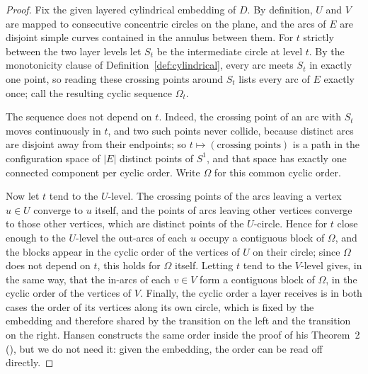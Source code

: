 \documentclass[11pt]{article}
\theoremstyle{definition}
\theoremstyle{remark}
\begin{document}
\begin{proof}
Fix the given layered cylindrical embedding of $D$. By definition, $U$ and $V$ are mapped to consecutive concentric circles on the plane, and the arcs of $E$ are disjoint simple curves contained in the annulus between them. For $t$ strictly between the two layer levels let $S_t$ be the intermediate circle at level $t$. By the monotonicity clause of Definition~\ref{def:cylindrical}, every arc meets $S_t$ in exactly one point, so reading these crossing points around $S_t$ lists every arc of $E$ exactly once; call the resulting cyclic sequence $\Omega_t$.

The sequence does not depend on $t$. Indeed, the crossing point of an arc with $S_t$ moves continuously in $t$, and two such points never collide, because distinct arcs are disjoint away from their endpoints; so $t\mapsto(\text{crossing points})$ is a path in the configuration space of $|E|$ distinct points of $S^1$, and that space has exactly one connected component per cyclic order. Write $\Omega$ for this common cyclic order.

Now let $t$ tend to the $U$-level. The crossing points of the arcs leaving a vertex $u\in U$ converge to $u$ itself, and the points of arcs leaving other vertices converge to those other vertices, which are distinct points of the $U$-circle. Hence for $t$ close enough to the $U$-level the out-arcs of each $u$ occupy a contiguous block of $\Omega$, and the blocks appear in the cyclic order of the vertices of $U$ on their circle; since $\Omega$ does not depend on $t$, this holds for $\Omega$ itself. Letting $t$ tend to the $V$-level gives, in the same way, that the in-arcs of each $v\in V$ form a contiguous block of $\Omega$, in the cyclic order of the vertices of $V$. Finally, the cyclic order a layer receives is in both cases the order of its vertices along its own circle, which is fixed by the embedding and therefore shared by the transition on the left and the transition on the right. Hansen constructs the same order inside the proof of his Theorem~2 (\cite[p.~6]{Hansen03}), but we do not need it: given the embedding, the order can be read off directly.
\end{proof}
\end{document}
